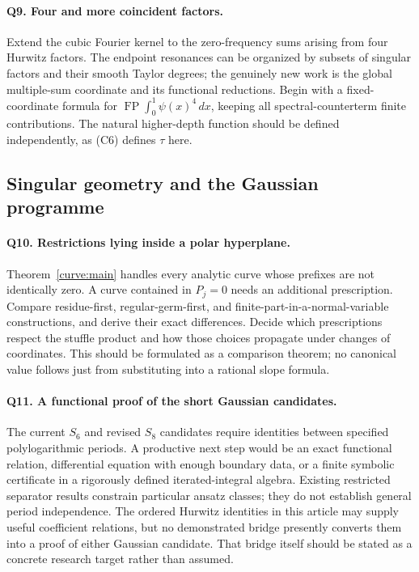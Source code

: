 \documentclass[11pt,letterpaper]{article}
\numberwithin{equation}{section}
\theoremstyle{definition}
\theoremstyle{remark}
\DeclareMathOperator{\FP}{FP}
\begin{document}
\paragraph{Q9. Four and more coincident factors.}
Extend the cubic Fourier kernel to the zero-frequency sums arising
from four Hurwitz factors. The endpoint resonances can be organized
by subsets of singular factors and their smooth Taylor degrees;
the genuinely new work is the global multiple-sum coordinate and its
functional reductions. Begin with a fixed-coordinate formula for
$\FP\int_0^1\psi(x)^4\,dx$, keeping all spectral-counterterm finite
contributions. The natural higher-depth function should be defined
independently, as (C6) defines $\tau$ here.

\subsection{Singular geometry and the Gaussian programme}

\paragraph{Q10. Restrictions lying inside a polar hyperplane.}
Theorem~\ref{curve:main} handles every analytic curve whose prefixes
are not identically zero. A curve contained in $P_j=0$ needs an
additional prescription. Compare residue-first, regular-germ-first,
and finite-part-in-a-normal-variable constructions, and derive their
exact differences. Decide which prescriptions respect the stuffle
product and how those choices propagate under changes of coordinates.
This should be formulated as a comparison theorem; no canonical
value follows just from substituting into a rational slope formula.

\paragraph{Q11. A functional proof of the short Gaussian candidates.}
The current $S_6$ and revised $S_8$ candidates require identities
between specified polylogarithmic periods. A productive next step
would be an exact functional relation, differential equation with
enough boundary data, or a finite symbolic certificate in a rigorously
defined iterated-integral algebra. Existing restricted separator
results constrain particular ansatz classes; they do not establish
general period independence. The ordered Hurwitz identities in this
article may supply useful coefficient relations, but no demonstrated
bridge presently converts them into a proof of either Gaussian
candidate. That bridge itself should be stated as a concrete research
target rather than assumed.
\end{document}
